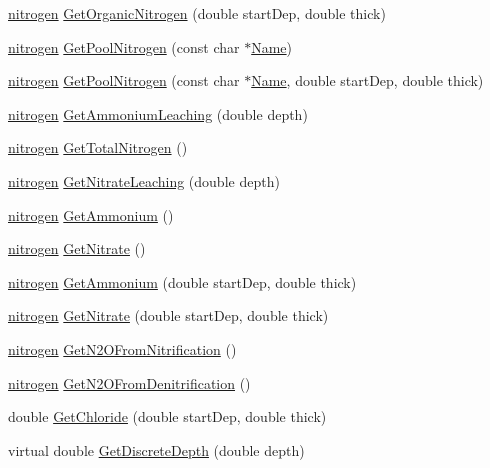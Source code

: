 \begin{DoxyCompactItemize}
\hyperlink{classnitrogen}{nitrogen} \hyperlink{classsoil_profile_a4fc437a3643651526cdba9cb737d81bb}{GetOrganicNitrogen} (double startDep, double thick)
\item 
\hyperlink{classnitrogen}{nitrogen} \hyperlink{classsoil_profile_a7cde7a4168ab9a8188fb4f6f18d79388}{GetPoolNitrogen} (const char $\ast$\hyperlink{classbase_abd8f99d007cb1914c0837488829974ec}{Name})
\item 
\hyperlink{classnitrogen}{nitrogen} \hyperlink{classsoil_profile_a928dcc3f93130bf5bff194453a36d4f8}{GetPoolNitrogen} (const char $\ast$\hyperlink{classbase_abd8f99d007cb1914c0837488829974ec}{Name}, double startDep, double thick)
\item 
\hyperlink{classnitrogen}{nitrogen} \hyperlink{classsoil_profile_a5714479e1a3ca3d9c0669dbdfedf3b57}{GetAmmoniumLeaching} (double depth)
\item 
\hyperlink{classnitrogen}{nitrogen} \hyperlink{classsoil_profile_aaed7e24507f4b6af78401c985ab1cc12}{GetTotalNitrogen} ()
\item 
\hyperlink{classnitrogen}{nitrogen} \hyperlink{classsoil_profile_aefe1b8475041b54e5f0a1fd6cdebff2a}{GetNitrateLeaching} (double depth)
\item 
\hyperlink{classnitrogen}{nitrogen} \hyperlink{classsoil_profile_ae08f75a5b3b0af43054c75f7c6b0867e}{GetAmmonium} ()
\item 
\hyperlink{classnitrogen}{nitrogen} \hyperlink{classsoil_profile_a753455cef3dae233090a481b833e25c6}{GetNitrate} ()
\item 
\hyperlink{classnitrogen}{nitrogen} \hyperlink{classsoil_profile_ae5719e1e82452eefb240900a9e62e27d}{GetAmmonium} (double startDep, double thick)
\item 
\hyperlink{classnitrogen}{nitrogen} \hyperlink{classsoil_profile_a52af6d32aff7208063bd86a2a8b3c25b}{GetNitrate} (double startDep, double thick)
\item 
\hyperlink{classnitrogen}{nitrogen} \hyperlink{classsoil_profile_a1a70449a5466f3a625a9b393ee18112f}{GetN2OFromNitrification} ()
\item 
\hyperlink{classnitrogen}{nitrogen} \hyperlink{classsoil_profile_a9be3f4ec8fe381095d2f9a15f1b7d77d}{GetN2OFromDenitrification} ()
\item 
double \hyperlink{classsoil_profile_a51f252742a43f831953d0ea34e273530}{GetChloride} (double startDep, double thick)
\item 
virtual double \hyperlink{classsoil_profile_a92895ed75f2779eb7a9468a4e5662f4e}{GetDiscreteDepth} (double depth)
\item 

\end{DoxyCompactItemize}
